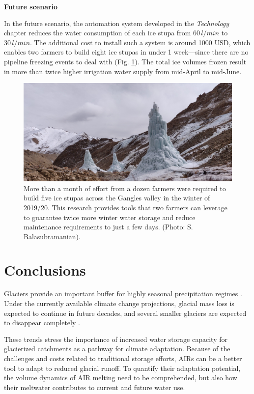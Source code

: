 \textbf{Future scenario}

In the future scenario, the automation system developed in the \textit{Technology} chapter reduces the water
consumption of each ice stupa from $60\,l/min$ to $30\,l/min$. The additional cost to install such a system is
around 1000 USD, which enables two farmers to build eight ice stupas in under 1 week---since there are no pipeline freezing events to deal with (Fig. \ref{fig:icestupa_valley}). The total ice
volumes frozen result in more than twice higher irrigation water supply from mid-April to
mid-June.

\begin{figure}[htb]
	\includegraphics[width=\textwidth]{figs/icestupa_valley}

  \caption{More than a month of effort from a dozen farmers were required to build five ice stupas across the
  Gangles valley in the winter of 2019/20. This research provides tools that two farmers can leverage to
  guarantee twice more winter water storage and reduce maintenance requirements to just a few days. (Photo:
  S. Balasubramanian).}

	\label{fig:icestupa_valley}
\end{figure}

\section{Conclusions}

Glaciers provide an important buffer for highly seasonal precipitation regimes
\citep{kaserContributionPotentialGlaciers2010}. Under the currently available climate change projections, glacial mass loss is expected to continue in future decades, and several smaller glaciers are expected to disappear completely \citep{rabatelCurrentStateGlaciers2013}.

These trends stress the importance of increased water storage capacity for glacierized catchments as a pathway
for climate adaptation. Because of the challenges and costs related to traditional storage efforts, \ac{AIRs} can
be a better tool to adapt to reduced glacial runoff. To quantify their adaptation potential, the volume dynamics of \ac{AIR} melting need to be comprehended, but also how their meltwater contributes to
current and future water use. 

